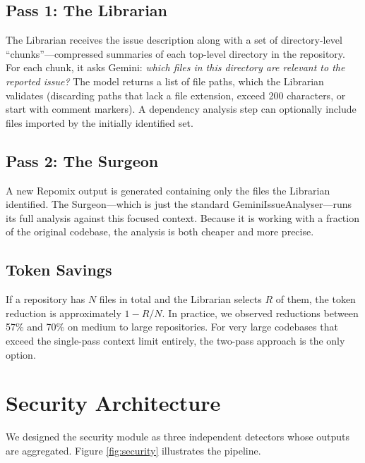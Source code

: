\subsection{Pass 1: The Librarian}
The Librarian receives the issue description along with a set of directory-level ``chunks''---compressed summaries of each top-level directory in the repository. For each chunk, it asks Gemini: \textit{which files in this directory are relevant to the reported issue?} The model returns a list of file paths, which the Librarian validates (discarding paths that lack a file extension, exceed 200 characters, or start with comment markers). A dependency analysis step can optionally include files imported by the initially identified set.

\subsection{Pass 2: The Surgeon}
A new Repomix output is generated containing only the files the Librarian identified. The Surgeon---which is just the standard GeminiIssueAnalyser---runs its full analysis against this focused context. Because it is working with a fraction of the original codebase, the analysis is both cheaper and more precise.

\subsection{Token Savings}
If a repository has $N$ files in total and the Librarian selects $R$ of them, the token reduction is approximately $1 - R/N$. In practice, we observed reductions between 57\% and 70\% on medium to large repositories. For very large codebases that exceed the single-pass context limit entirely, the two-pass approach is the only option.

\section{Security Architecture}

We designed the security module as three independent detectors whose outputs are aggregated. Figure \ref{fig:security} illustrates the pipeline.


